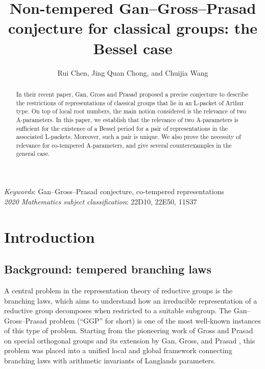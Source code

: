 \documentclass[11pt,letterpaper]{amsart}
\title[Non-tempered GGP conjecture for classical groups: the Bessel case]
{Non-tempered Gan--Gross--Prasad conjecture for classical groups: the Bessel case}
\author{Rui Chen, Jing Quan Chong, and Chuijia Wang}
\theoremstyle{plain}
\numberwithin{theorem}{section}
\numberwithin{equation}{subsection}
\theoremstyle{remark}
\begin{document}
\begin{abstract}
In their recent paper, Gan, Gross and Prasad proposed a precise conjecture to describe the restrictions of representations of classical groups that lie in an L-packet of Arthur type. On top of local root numbers, the main notion considered is the relevance of two A-parameters. In this paper, we establish that the relevance of two A-parameters is sufficient for the existence of a Bessel period for a pair of representations in the associated L-packets. Moreover, such a pair is unique. We also prove the necessity of relevance for co-tempered A-parameters, and give several counterexamples in the general case.
\end{abstract}

\maketitle

\textit{Keywords}: Gan--Gross--Prasad conjecture, co-tempered representations\\

\textit{2020 Mathematics subject classification}: 22D10, 22E50, 11S37

\section{Introduction}

\subsection{Background: tempered branching laws}

A central problem in the representation theory of reductive groups is the branching laws, which aims to understand how an irreducible representation of a reductive group decomposes when restricted to a suitable subgroup. The Gan--Gross--Prasad problem (``GGP'' for short) is one of the most well-known instances of this type of problem. Starting from the pioneering work of Gross and Prasad on special orthogonal groups \cite{MR1186476, MR1295124} and its extension by Gan, Gross, and Prasad \cite{MR3202556}, this problem was placed into a unified local and global framework connecting branching laws with arithmetic invariants of Langlands parameters.

\vskip 5pt
\end{document}
